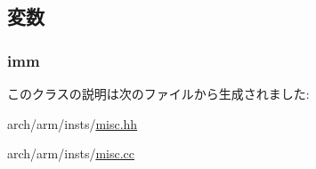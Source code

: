 \subsection{変数}
\hypertarget{classMsrImmOp_a3aa9e175bd81b38df0e566643d5d4f8d}{
\subsubsection[{imm}]{ {\bf imm}}}
\label{classMsrImmOp_a3aa9e175bd81b38df0e566643d5d4f8d}


このクラスの説明は次のファイルから生成されました:\begin{DoxyCompactItemize}
\item 
arch/arm/insts/\hyperlink{arch_2arm_2insts_2misc_8hh}{misc.hh}\item 
arch/arm/insts/\hyperlink{arch_2arm_2insts_2misc_8cc}{misc.cc}\end{DoxyCompactItemize}
